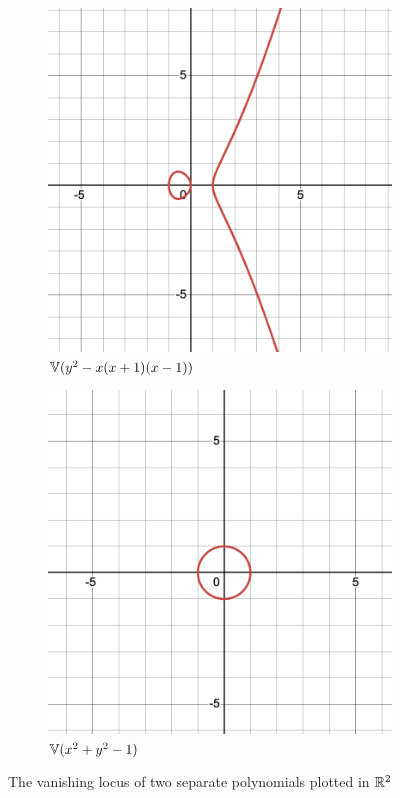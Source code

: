 \begin{figure}[h]
    \centering
    \begin{subfigure}[b]{0.45\textwidth}
        \centering
        \includegraphics[scale = 0.2]{images/Varieties/desmos-graph2.png}
        \caption{$\mathbb{V}(y^2 - x(x+1)(x-1))$}
    \end{subfigure}
    \hfill
    \begin{subfigure}[b]{0.45\textwidth}
            \centering
            \includegraphics[scale = 0.2]{images/Varieties/desmos-graph.png}
            \caption{$\mathbb{V}(x^2 + y^2 - 1)$}
    \end{subfigure}
\caption{The vanishing locus of two separate polynomials plotted in $\mathbb{R}^2$}
\end{figure}

